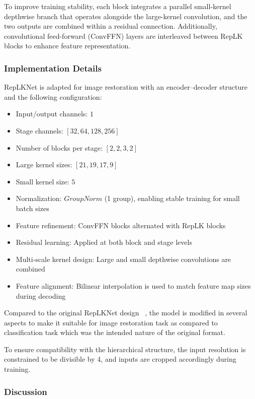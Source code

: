 To improve training stability, each block integrates a parallel small-kernel depthwise branch that operates alongside the large-kernel convolution, and the two outputs are combined within a residual connection.  Additionally, convolutional feed-forward (ConvFFN) layers are interleaved between RepLK blocks to enhance feature representation.

\subsubsection{Implementation Details}

RepLKNet is adapted for image restoration with an encoder--decoder structure and the following configuration:

\begin{itemize}
    \item Input/output channels: $1$
    \item Stage channels: $[32, 64, 128, 256]$
    \item Number of blocks per stage: $[2, 2, 3, 2]$
    \item Large kernel sizes: $[21, 19, 17, 9]$
    \item Small kernel size: $5$
    \item Normalization: $GroupNorm$ (1 group), enabling stable training for small batch sizes 
    \item  Feature refinement: ConvFFN blocks alternated with RepLK blocks  
    \item Residual learning: Applied at both block and stage levels  
    \item  Multi-scale kernel design: Large and small depthwise convolutions are combined  
    \item Feature alignment: Bilinear interpolation is used to match feature map sizes during decoding
\end{itemize}

Compared to the original RepLKNet design ~\cite{replknet2022}, the model is modified in several aspects to make it suitable for image restoration task as compared to classification task which was the intended nature of the original format. 

To ensure compatibility with the hierarchical structure, the input resolution is constrained to be divisible by 4, and inputs are cropped accordingly during training.

\subsubsection{Discussion}

